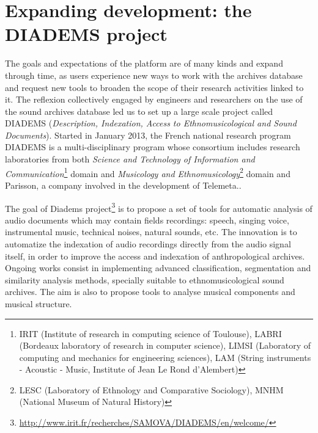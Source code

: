 \documentclass{sig-alternate}
\newcommand{\comment}[1]{\footnote{\color{red} \bf{{#1}}}}
\begin{document}
\section{Expanding development: the DIADEMS project}

The goals and expectations of the platform are of many kinds and expand through time, as users experience new ways to work with the archives database and request new tools to broaden the scope of their research activities linked to it. The reflexion collectively engaged by engineers and researchers on the use of the sound archives database led us  to set up a large scale project called DIADEMS (\emph{Description, Indexation, Access to Ethnomusicological and Sound Documents}). 
Started in January 2013, the French national research program DIADEMS is a multi-disciplinary program whose consortium includes research laboratories from both\emph{ Science and Technology of Information and Communication}\footnote{IRIT (Institute of research in computing science of Toulouse), LABRI (Bordeaux laboratory of research in computer science), LIMSI (Laboratory of computing and mechanics for engineering sciences), LAM (String instruments - Acoustic - Music, Institute of Jean Le Rond d'Alembert)} domain and \emph{Musicology and Ethnomusicology}\footnote{LESC (Laboratory of Ethnology and Comparative Sociology), MNHM (National Museum of Natural History)} domain and Parisson, a company involved in the development of Telemeta..
 
The goal of Diadems project\footnote{\url{http://www.irit.fr/recherches/SAMOVA/DIADEMS/en/welcome/}} is to propose a set of tools for automatic analysis of audio documents which may contain fields recordings: speech, singing voice, instrumental music, technical noises, natural sounds, etc. The innovation is to automatize the indexation of  audio recordings directly from the audio signal itself, in order to improve the access and indexation of anthropological archives. Ongoing works consist in implementing advanced classification, segmentation and similarity analysis methods,  specially suitable to ethnomusicological sound archives. The aim is also to propose tools to analyse musical components and musical structure. 
\end{document}
